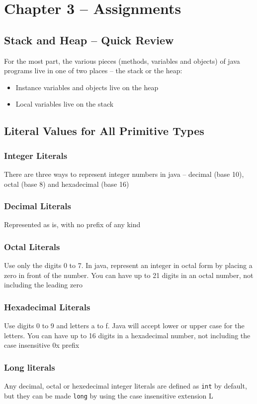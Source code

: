 \section{Chapter 3 -- Assignments}
\subsection{Stack and Heap -- Quick Review}
For the most part, the various pieces (methods, variables and objects) of java 
programs live in one of two places -- the stack or the heap:
\begin{itemize}
    \item Instance variables and objects live on the heap
    \item Local variables live on the stack
\end{itemize}

\subsection{Literal Values for All Primitive Types}
\subsubsection{Integer Literals}
There are three ways to represent integer numbers in java -- decimal (base 10), 
octal (base 8) and hexadecimal (base 16)

\subsubsection{Decimal Literals}
Represented as is, with no prefix of any kind

\subsubsection{Octal Literals}
Use only the digits 0 to 7. In java, represent an integer in octal form by 
placing a zero in front of the number. You can have up to 21 digits in an octal 
number, not including the leading zero

\subsubsection{Hexadecimal Literals}
Use digits 0 to 9 and letters a to f. Java will accept lower or upper case for 
the letters. You can have up to 16 digits in a hexadecimal number, not 
including the case insensitive 0x prefix

\subsubsection{Long literals}
Any decimal, octal or hexedecimal integer literals are defined as \verb#int# by 
default, but they can be made \verb#long# by using the case insensitive
extension L

